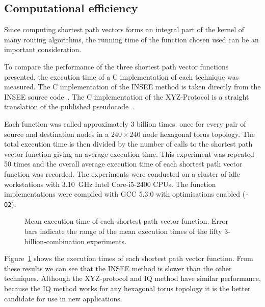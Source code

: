 		\subsection{Computational efficiency}
			
			Since computing shortest path vectors forms an integral part of the
			kernel of many routing algorithms, the running time of the function
			chosen used can be an important consideration.
			
			To compare the performance of the three shortest path vector functions
			presented, the execution time of a C implementation of each technique was
			measured. The C implementation of the INSEE method is taken directly from
			the INSEE source code~\cite{navaridas09}. The C implementation of the
			XYZ-Protocol is a straight translation of the published
			pseudocode~\cite{hoffmann15}.
			
			Each function was called approximately 3 billion times: once for every
			pair of source and destination nodes in a $240\times240$ node hexagonal
			torus topology. The total execution time is then divided by the number of
			calls to the shortest path vector function giving an average execution
			time.  This experiment was repeated 50 times and the overall average
			execution time of each shortest path vector function was recorded. The
			experiments were conducted on a cluster of idle workstations with
			3.10~GHz Intel Core-i5-2400 CPUs. The function implementations were
			compiled with GCC 5.3.0 with optimisations enabled (\verb|-O2|).
			
			\begin{figure}
				\center
				
				\caption[Mean execution time of shortest path vector functions.]%
				{Mean execution time of each shortest path vector function. Error bars
				indicate the range of the mean execution times of the fifty
				3-billion-combination experiments.}
				\label{fig:shortest-path-vector-runtimes}
			\end{figure}
			
			Figure~\ref{fig:shortest-path-vector-runtimes} shows the execution times
			of each shortest path vector function. From these results we can see that
			the INSEE method is slower than the other techniques. Although the
			XYZ-protocol and IQ method have similar performance, because the IQ
			method works for any hexagonal torus topology it is the better candidate
			for use in new applications.
	

